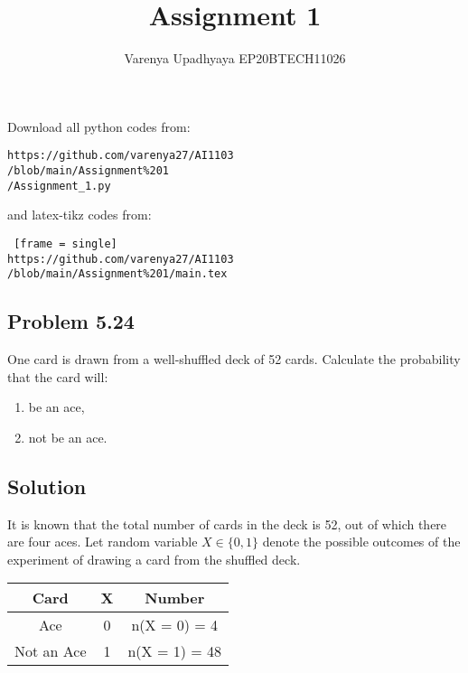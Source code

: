 \documentclass[journal,12pt,twocolumn]{IEEEtran}
\title{Assignment 1}
\author{Varenya Upadhyaya EP20BTECH11026}
\date{}
\begin{document}
\maketitle
Download all python codes from: 
\begin{lstlisting}[frame = single]
https://github.com/varenya27/AI1103
/blob/main/Assignment%201
/Assignment_1.py
\end{lstlisting}
and latex-tikz codes from:
\begin{lstlisting} [frame = single]
https://github.com/varenya27/AI1103
/blob/main/Assignment%201/main.tex
\end{lstlisting}
\maketitle   
\begin{center}
\section*{Problem 5.24}
\end{center}
One card is drawn from a well-shuffled deck of 52 cards. Calculate the probability that the card will:
\begin{enumerate}[label=(\roman*)]
    \item be an ace,
    \item not be an ace.
\end{enumerate}
\begin{center}
\maketitle
    \section*{Solution}
\end{center}
It is known that the total number of cards in the deck is 52, out of which there are four aces. Let random variable $X \in \{0,1\}$ denote the possible outcomes of the experiment of drawing a card from the shuffled deck.\\
\begin{center}
    \begin{tabular}{|c|c|c|}
    \hline
    \textbf{Card} & \textbf{X} & \textbf{Number}\\
    \hline
    Ace & 0 & n(X = 0) = 4\\
    \hline
    Not an Ace & 1 & n(X = 1) = 48\\
    \hline
    \end{tabular}
\end{center}
\end{document}
